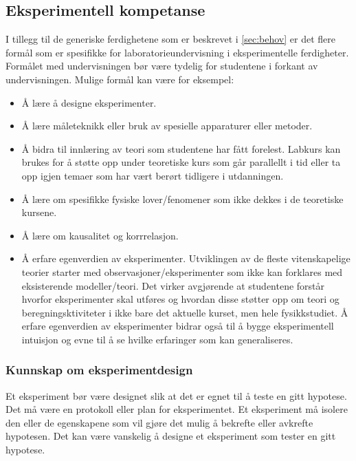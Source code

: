 \documentclass{article}
\begin{document}
\subsection{Eksperimentell kompetanse}
\label{sec:behov-exp}
I tillegg til de generiske ferdighetene som er beskrevet i \cref{sec:behov} er det flere formål som er spesifikke for laboratorieundervisning i eksperimentelle ferdigheter. Formålet med undervisningen bør være tydelig for studentene i forkant av undervisningen. Mulige formål kan være for eksempel:
\begin{itemize}
  \item Å lære å designe eksperimenter.
  \item Å lære måleteknikk eller bruk av spesielle apparaturer eller metoder.
  \item Å bidra til innlæring av teori som studentene har fått forelest. Labkurs kan brukes for å støtte opp under teoretiske kurs som går parallellt i tid eller ta opp igjen temaer som har vært berørt tidligere i utdanningen.
  \item Å lære om spesifikke fysiske lover/fenomener som
    ikke dekkes i de teoretiske kursene.
  \item Å lære om kausalitet og korrrelasjon.
  \item Å erfare egenverdien av eksperimenter. Utviklingen av de fleste vitenskapelige teorier starter med observasjoner/eksperimenter som ikke kan forklares med eksisterende modeller/teori.
    Det virker avgjørende at studentene forstår hvorfor eksperimenter skal utføres og hvordan disse støtter opp om teori og beregningsktiviteter i ikke bare det aktuelle kurset, men hele fysikkstudiet. Å erfare egenverdien av eksperimenter bidrar også til å bygge eksperimentell intuisjon og evne til å se hvilke erfaringer som kan generaliseres.
\end{itemize}

\subsubsection{Kunnskap om eksperimentdesign}
Et eksperiment bør være designet slik at det er egnet til å teste en gitt hypotese.
Det må være en protokoll eller plan for eksperimentet.
Et eksperiment må isolere den eller de egenskapene som vil gjøre det mulig å bekrefte eller avkrefte hypotesen.
Det kan være vanskelig å designe et eksperiment som tester en gitt hypotese.
\end{document}
